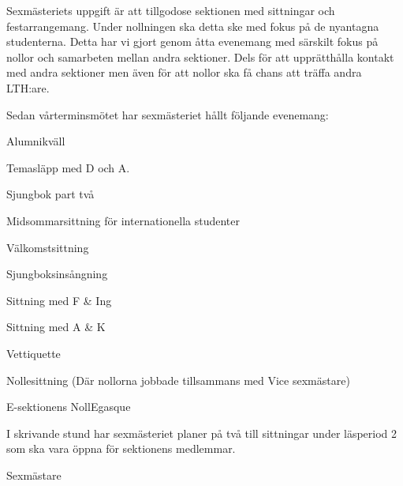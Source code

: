 \documentclass[../_main/handlingar.tex]{subfiles}
\begin{document}
\vspace{8px}

Sexmästeriets uppgift är att tillgodose sektionen med sittningar och festarrangemang. Under nollningen ska detta ske med fokus på de nyantagna studenterna. Detta har vi gjort genom åtta evenemang med särskilt fokus på nollor och samarbeten mellan andra sektioner. Dels för att upprätthålla kontakt med andra sektioner men även för att nollor ska få chans att träffa andra LTH:are.

Sedan vårterminsmötet har sexmästeriet hållt följande evenemang:


\begin{dashlist}
    \item Alumnikväll
    \item Temasläpp med D och A.
    \item Sjungbok part två
    \item Midsommarsittning för internationella studenter
    \item Välkomstsittning
    \item Sjungboksinsångning
    \item Sittning med F \& Ing
    \item Sittning med A \& K
    \item Vettiquette
    \item Nollesittning (Där nollorna jobbade tillsammans med Vice sexmästare)
    \item E-sektionens NollEgasque
\end{dashlist}


I skrivande stund har sexmästeriet planer på två till sittningar under läsperiod 2 som ska vara öppna för sektionens medlemmar.



\begin{signatures}{1}
    \mvh
    \signature{Theo Nyman}{Sexmästare}
\end{signatures}
\end{document}
